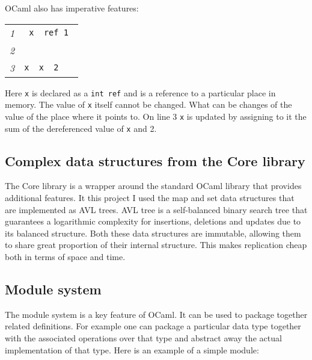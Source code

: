 \documentclass[12pt,twoside,notitlepage]{report}
\newcommand{\mlkeywordA}[1]{\mbox{\color{cyan}{\textbf{\texttt{#1}}}}}
\newcommand{\mlkeyword}[1]{\mbox{\color{red}{#1}}}
\newcommand{\mloperator}[1]{\mbox{\color{darkgreen}{#1}}}
\newcommand{\mlcodeline}[2]{\tiny\sl #1 & \begin{minipage}[c]{0.8\linewidth}\begin{alltt}\mbox{#2}\end{alltt}\end{minipage}\\}
\begin{document}
OCaml also has imperative features:



{\scriptsize\noindent\begin{longtable}{r|l}
\mlcodeline{1}{\mlkeywordA{let}~x~\mlkeyword{=}~ref~1
}
\mlcodeline{2}{
}
\mlcodeline{3}{x~\mloperator{\mbox{\COLON}{}=}~\mloperator{\mbox{}\hspace{0pt}{!}\hspace{0pt}}x~\mloperator{+}~2~
}
\end{longtable}
}

Here {\tt x} is declared as a {\tt int ref} and is a reference to a particular place in memory. The value of {\tt x} itself cannot be changed. What can be changes of the value of the place where it points to. On line 3 {\tt x} is updated by assigning to it the sum of the dereferenced value of {\tt x} and 2.  


\subsection{Complex data structures from the Core library}
The Core library is a wrapper around the standard OCaml library that provides additional features. It this project I used the map and set data structures that are implemented as AVL trees. AVL tree is a self-balanced binary search tree that guarantees a logarithmic complexity for insertions, deletions and updates due to its balanced structure. Both these data structures are immutable, allowing them to share great proportion of their internal structure. This makes replication cheap both in terms of space and time.

\subsection{Module system}
The module system is a key feature of OCaml. It can be used to package together related definitions. For example one can package a particular data type together with the associated operations over that type and abstract away the actual implementation of that type. Here is an example of a simple module:

\end{document}
